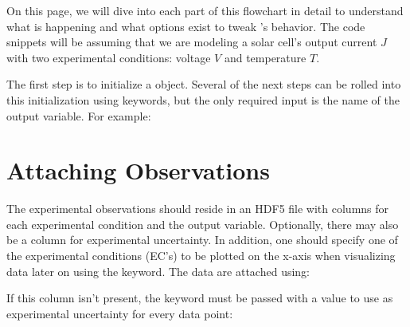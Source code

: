 \documentclass[letterpaper,10pt,english]{sphinxmanual}
\begin{document}
On this page, we will dive into each part of this flowchart in detail to understand what is happening and what options exist to tweak ’s behavior. The code snippets will be assuming that we are modeling a solar cell’s output current \(J\) with two experimental conditions: voltage \(V\) and temperature \(T\).

The first step is to initialize a  object. Several of the next steps can be rolled into this initialization using keywords, but the only required input is the name of the output variable. For example:

%
\begin{sphinxVerbatim}[commandchars=\\\{\}]
   
  
\end{sphinxVerbatim}


\section{Attaching Observations}
\label{\detokenize{manual:attaching-observations}}\label{\detokenize{manual:attach-obs}}
The experimental observations should reside in an HDF5 file with columns for each experimental condition and the output variable. Optionally, there may also be a column for experimental uncertainty. In addition, one should specify one of the experimental conditions (EC’s) to be plotted on the x-axis when visualizing data later on using the  keyword. The data are attached using:

%
\begin{sphinxVerbatim}[commandchars=\\\{\}]
 
\end{sphinxVerbatim}

If this column isn’t present, the  keyword must be passed with a value to use as experimental uncertainty for every data point:
\end{document}
